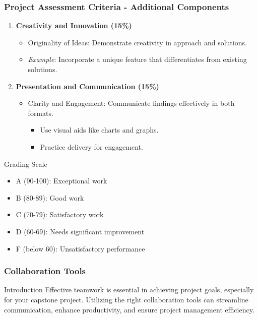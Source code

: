 \documentclass[aspectratio=169]{beamer}
\begin{document}
\begin{frame}[fragile]
    \frametitle{Project Assessment Criteria - Additional Components}
    \begin{enumerate}[resume]
        \item \textbf{Creativity and Innovation (15\%)}
            \begin{itemize}
                \item Originality of Ideas: Demonstrate creativity in approach and solutions.
                \item \textit{Example}: Incorporate a unique feature that differentiates from existing solutions.
            \end{itemize}

        \item \textbf{Presentation and Communication (15\%)}
            \begin{itemize}
                \item Clarity and Engagement: Communicate findings effectively in both formats.
                \begin{itemize}
                    \item Use visual aids like charts and graphs.
                    \item Practice delivery for engagement.
                \end{itemize}
            \end{itemize}
    \end{enumerate}
    
    \begin{block}{Grading Scale}
        \begin{itemize}
            \item A (90-100): Exceptional work
            \item B (80-89): Good work
            \item C (70-79): Satisfactory work
            \item D (60-69): Needs significant improvement
            \item F (below 60): Unsatisfactory performance
        \end{itemize}
    \end{block}
\end{frame}

\begin{frame}[fragile]
    \frametitle{Collaboration Tools}
    \begin{block}{Introduction}
        Effective teamwork is essential in achieving project goals, especially for your capstone project. Utilizing the right collaboration tools can streamline communication, enhance productivity, and ensure project management efficiency. 
    \end{block}
\end{frame}
\end{document}
